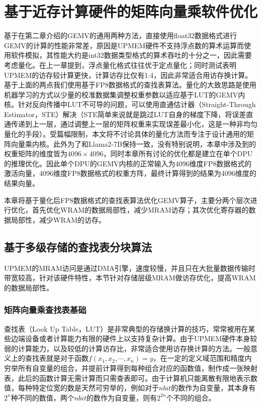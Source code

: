 \chapter{基于近存计算硬件的矩阵向量乘软件优化}
基于在第二章介绍的GEMV的通用两种方法，直接使用float32数据格式进行GEMV的计算的性能非常差，原因是UPMEM硬件不支持浮点数的算术运算而使用软件模拟，其性能大约是int32数据类型格式的算术吞吐的十分之一\cite{BenchmarkingMutlu}，因此需要考虑量化。在上一章提到，浮点量化格式往往优于定点量化\cite{ZeroQuantFP}；同时测试表明UPMEM的访存较计算更快，计算访存比仅有1:4\cite{BenchmarkingMutlu}，因此非常适合用访存换计算。基于上面的两点我们使用基于FP8数据格式\cite{FP8}的查找表算法。量化的大致思路是使用机器学习的方式以少量的校准数据集调整权重参数以适应基于LUT的GEMV内核。针对反向传播中LUT不可导的问题，可以使用直通估计器（Straight-Through Estimator，STE）解决\cite{NonuniformQuant}（STE简单来说就是跳过LUT自身的梯度下降，将误差直通传递到上一层，通过调整上一层的矩阵权重来实现误差最小化，这是一种非均匀量化的手段）。受篇幅限制，本文将不讨论具体的量化方法而专注于设计通用的矩阵向量乘内核。此外为了和Llama2-7B保持一致，没有特别说明，本章中涉及到的权重矩阵的维度皆为$4096\times 4096$，同时本章所有讨论的优化都是建立在单个DPU的推理优化。因此单个DPU的GEMV内核的正常输入为4096维度FP8数据格式的激活向量，4096维度FP8数据格式的权重方阵，最终计算得到的结果为4096维度的结果向量。

本章将基于量化后FP8数据格式的查找表算法优化GEMV算子，主要分两个层次进行优化，首先优化WRAM的数据局部性，减少MRAM访存；其次优化寄存器的数据局部性，减少WRAM的访存。

\section{基于多级存储的查找表分块算法}
UPMEM的MRAM访问是通过DMA引擎，速度较慢，并且只在大批量数据传输时带宽较高，针对该硬件特性，本节针对存储层级MRAM做访存优化，提高WRAM的数据局部性。

\subsection{矩阵向量乘查找表基础}
查找表（Look Up Table，LUT）是非常典型的存储换计算的技巧，常常被用在某些边端设备或者计算能力有限的硬件上以支持复杂计算。由于UPMEM硬件本身较弱的计算能力，以及较低的计算访存比，非常适合使用访存换计算的方法。一般意义上的查找表就是对于函数$f(x_1,x_2,\cdots,x_n)=y$，在一定的定义域范围和精度内穷举所有自变量的组合，并提前计算得到每种组合对应的函数值，制作成一张映射表，此后的函数计算无需计算而只需查表即可。由于计算机只能离散有限地表示数值，每种特定位宽的数是天然可穷举的，例如对于$n bit$的数作为自变量，其本身有$2^n$种不同的数值，两个$n bit$的数作为自变量，则有$2^{2n}$个不同的组合。

